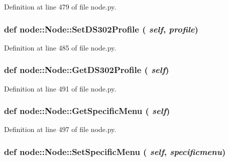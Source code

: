 Definition at line 479 of file node.py.\hypertarget{classnode_1_1Node_1491687050feb7aa267e83fbe3379631}{
\subsubsection[SetDS302Profile]{\setlength{\rightskip}{0pt plus 5cm}def node::Node::Set\-DS302Profile ( {\em self},  {\em profile})}}
\label{classnode_1_1Node_1491687050feb7aa267e83fbe3379631}




Definition at line 485 of file node.py.\hypertarget{classnode_1_1Node_65b0ff7710846dc865eeff2de2acd948}{
\subsubsection[GetDS302Profile]{\setlength{\rightskip}{0pt plus 5cm}def node::Node::Get\-DS302Profile ( {\em self})}}
\label{classnode_1_1Node_65b0ff7710846dc865eeff2de2acd948}




Definition at line 491 of file node.py.\hypertarget{classnode_1_1Node_5b69098e7e38001df37d95a3e656aa6e}{
\subsubsection[GetSpecificMenu]{\setlength{\rightskip}{0pt plus 5cm}def node::Node::Get\-Specific\-Menu ( {\em self})}}
\label{classnode_1_1Node_5b69098e7e38001df37d95a3e656aa6e}




Definition at line 497 of file node.py.\hypertarget{classnode_1_1Node_da729222acaeb10d8e79a4e94d22602e}{
\subsubsection[SetSpecificMenu]{\setlength{\rightskip}{0pt plus 5cm}def node::Node::Set\-Specific\-Menu ( {\em self},  {\em specificmenu})}}
\label{classnode_1_1Node_da729222acaeb10d8e79a4e94d22602e}




